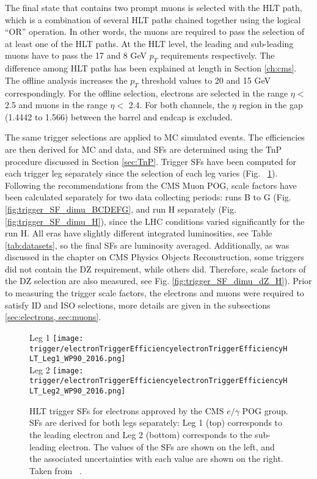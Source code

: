 The final state that contains two prompt muons is selected with the HLT path, which is a combination of several HLT paths chained together using the logical ``OR'' operation. In other words, the muons are required to pass the selection of at least one of the HLT paths. At the HLT level, the leading and sub-leading muons have to pass the 17 and 8 GeV $p_T$ requirements respectively. The difference among HLT paths has been explained at length in Section \ref{ch:cms}. The offline analysis increases the $p_T$ threshold values to 20 and 15 GeV correspondingly. For the offline selection, electrons are selected in the range $\eta < $ 2.5 and muons in the range $\eta < $ 2.4. For both channels, the $\eta$ region in the gap (1.4442 to 1.566) between the barrel and endcap is excluded.

The same trigger selections are applied to MC simulated events. The efficiencies are then derived for MC and data, and SFs are determined using the TnP procedure discussed in Section \ref{sec:TnP}. Trigger SFs have been computed for each trigger leg separately since the selection of each leg varies (Fig. ~\ref{fig:trigger_eff_diele}). Following the recommendations from the CMS Muon POG, scale factors have been calculated separately for two data collecting periods: runs B to G (Fig. \ref{fig:trigger_SF_dimu_BCDEFG}, and run H separately (Fig. \ref{fig:trigger_SF_dimu_H}), since the LHC conditions varied significantly for the run H. All eras have slightly different integrated luminosities, see Table \ref{tab:datasets}, so the final SFs are luminosity averaged. Additionally, as was discussed in the chapter on CMS Physics Objects Reconstruction, some triggers did not contain the DZ requirement, while others did. Therefore, scale factors of the DZ selection are also measured, see Fig. \ref{fig:trigger_SF_dimu_dZ_H}). Prior to measuring the trigger scale factors, the electrons and muons were required to satisfy ID and ISO selections, more details are given in the subsections \ref{sec:electrons, sec:muons}. 

\begin{figure}[H]
\centering
\subfloat Leg 1
{\texttt{[image: trigger/electronTriggerEfficiencyelectronTriggerEfficiencyHLT\_Leg1\_WP90\_2016.png]} } \\
\subfloat Leg 2
{\texttt{[image: trigger/electronTriggerEfficiencyelectronTriggerEfficiencyHLT\_Leg2\_WP90\_2016.png]} } \\
\caption[HLT trigger SFs for electrons.]{HLT trigger SFs for electrons approved by the CMS $e/ \gamma$ POG group. SFs are derived for both legs separately: Leg 1 (top) corresponds to the leading electron and Leg 2 (bottom) corresponds to the sub-leading electron. The values of the SFs are shown on the left, and the associated uncertainties with each value are shown on the right. Taken from ~\cite{vhbbAN}.}
\label{fig:trigger_eff_diele}
\end{figure}

